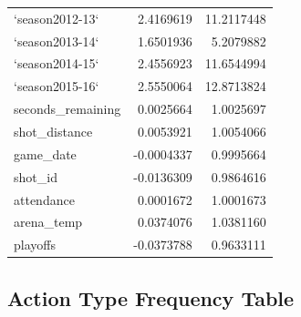 \documentclass[american,]{article}
\begin{document}
\begin{longtable}{lrr}
\rowcolor{gray!6}  `season2012-13` & 2.4169619 & 11.2117448\\
`season2013-14` & 1.6501936 & 5.2079882\\
\rowcolor{gray!6}  `season2014-15` & 2.4556923 & 11.6544994\\
`season2015-16` & 2.5550064 & 12.8713824\\
\rowcolor{gray!6}  seconds\_remaining & 0.0025664 & 1.0025697\\
\addlinespace
shot\_distance & 0.0053921 & 1.0054066\\
\rowcolor{gray!6}  game\_date & -0.0004337 & 0.9995664\\
shot\_id & -0.0136309 & 0.9864616\\
\rowcolor{gray!6}  attendance & 0.0001672 & 1.0001673\\
arena\_temp & 0.0374076 & 1.0381160\\
\addlinespace
\rowcolor{gray!6}  playoffs & -0.0373788 & 0.9633111\\*
\end{longtable}
\endgroup{}

\hypertarget{action-type-frequency-table}{%
\subsection{\texorpdfstring{\textbf{Action Type Frequency Table}}{Action Type Frequency Table}}\label{action-type-frequency-table}}

\begingroup\fontsize{10}{12}\selectfont
\end{document}
